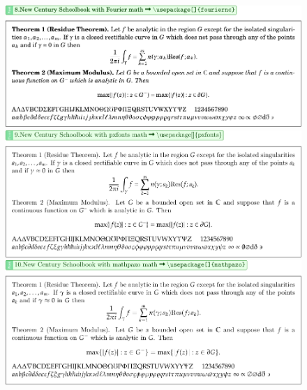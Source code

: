 \documentclass[12pt]{article}
\begin{document}
\begin{figure}[!htb]
    \centering
    \includegraphics[width=.95\linewidth]{./MathFontVision/New-Century-Schoolbook-with-Fourier-Math.pdf}
    
    \vspace*{2em}
    \includegraphics[width=.95\linewidth]{./MathFontVision/New-Century-Schoolbook-with-Pxfonts-Math.pdf}
    
    \vspace*{2em}
    \includegraphics[width=.95\linewidth]{./MathFontVision/New-Century-Schoolbook-with-Mathpazo-Math.pdf}
\end{figure}
\end{document}

